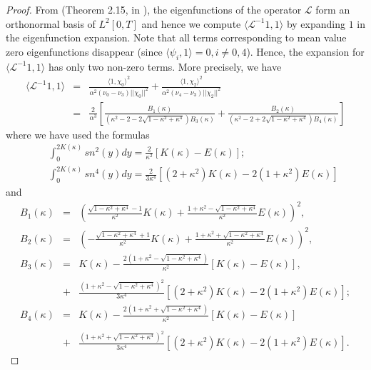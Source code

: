 \documentclass[final,11pt,leqno]{amsart}
\begin{document}
\begin{proof}
From (Theorem 2.15, in \cite{MaWi}), the eigenfunctions of the
operator ${\mathcal L}$ form an orthonormal  basis of  $L^2[0,T]$ and hence
we compute ${\langle {{\mathcal L}^{-1} 1},{1} \rangle}$  by expanding $1$ in the
eigenfunction expansion. Note that all  terms corresponding to
mean value zero eigenfunctions disappear (since ${\langle {\psi_i},{1} \rangle}=0, i\neq 0,4$).
Hence, the expansion for ${\langle {{\mathcal L}^{-1} 1},{1} \rangle}$ has only two
non-zero terms.  More precisely, we have
  \begin{eqnarray}
\nonumber
  \langle \mathcal{L}^{-1}1,1\rangle & = & {\frac{ \langle 1,
  \chi_0\rangle ^2}{\alpha^2(\nu_0-\nu_3)||\chi_0||^2}}+{\frac{ \langle 1,
  \chi_2\rangle ^2}{\alpha^2(\nu_4-\nu_3)||\chi_2||^2}}\\
 \label{mkdv3a}
  &=&
  {\frac{2}{\alpha^3}}\left[
{\frac{B_1(\kappa)}{(\kappa^2-2-2\sqrt{1-\kappa^2+\kappa^4})B_3(\kappa)}}+
  {\frac{B_2(\kappa)}{(\kappa^2-2+2\sqrt{1-\kappa^2+\kappa^4})B_4(\kappa)}}\right]
  \end{eqnarray}
where we have used the formulas
\begin{eqnarray*}
 & &  \int_{0}^{2K(\kappa)} sn^2(y) dy=\frac{2}{\kappa^2} [K(\kappa)-E(\kappa)]; \\
 & &  \int_{0}^{2K(\kappa)}{sn^4(y)}dy={\frac{2}{3\kappa^4}}[(2+\kappa^2)K(\kappa)-2(1+\kappa^2)E(\kappa)]
\end{eqnarray*}
 and
 \begin{eqnarray*}
  B_1(\kappa) &=&  \left(
  {\frac{\sqrt{1-\kappa^2+\kappa^4}-1}{\kappa^2}}K(\kappa)+{\frac{1+\kappa^2-\sqrt{1-\kappa^2+\kappa^4}}{\kappa^2}}E(\kappa)\right)^2, \\
  B_2(\kappa) &=& \left(-{\frac{\sqrt{1-\kappa^2+\kappa^4}+1}{\kappa^2}}K(\kappa)+{\frac{1+\kappa^2+\sqrt{1-\kappa^2+\kappa^4}}{\kappa^2}}E(\kappa)\right)^2,\\
  B_3(\kappa)&= &K(\kappa)-{\frac{2(1+\kappa^2-\sqrt{1-\kappa^2+\kappa^4})}{\kappa^2}}[K(\kappa)-E(\kappa)],\\
  \\
  &+&{\frac{(1+\kappa^2-\sqrt{1-\kappa^2+\kappa^4})^2}{3\kappa^4}}
  [(2+\kappa^2)K(\kappa)-2(1+\kappa^2)E(\kappa)]; \\
  B_4(\kappa)&= & K(\kappa)-{\frac{2(1+\kappa^2+\sqrt{1-\kappa^2+\kappa^4})}{\kappa^2}}[K(\kappa)-E(\kappa)]\\
  \\
  &+& {\frac{(1+\kappa^2+\sqrt{1-\kappa^2+\kappa^4})^2}{3\kappa^4}}
  [(2+\kappa^2)K(\kappa)-2(1+\kappa^2)E(\kappa)].
  \end{eqnarray*}

\end{proof}
\end{document}
